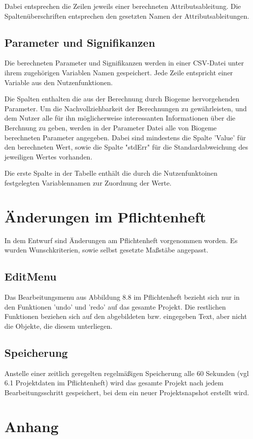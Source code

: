\documentclass{article}
\begin{document}
Dabei entsprechen die Zeilen jeweils einer berechneten Attributsableitung. Die Spaltenüberschriften entsprechen den gesetzten Namen der Attributsableitungen. 

\subsection{Parameter und Signifikanzen}
Die berechneten Parameter und Signifikanzen werden in einer CSV-Datei unter ihrem zugehörigen Variablen Namen gespeichert. Jede Zeile entspricht einer Variable aus den Nutzenfunktionen.

Die Spalten enthalten die aus der Berechnung durch Biogeme hervorgehenden Parameter. Um die Nachvollziehbarkeit der Berechnungen zu gewährleisten, und dem Nutzer alle für ihn  möglicherweise interessanten Informationen über die Berchnung zu geben, werden in der Parameter Datei alle von Biogeme berechneten Parameter angegeben. Dabei sind mindestens die Spalte 'Value' für den berechneten Wert, sowie die Spalte "stdErr" für die Standardabweichung des jeweiligen Wertes vorhanden.

Die erste Spalte in der Tabelle enthält die durch die Nutzenfunktoinen festgelegten Variablennamen zur Zuordnung der Werte.


\section{Änderungen im Pflichtenheft}
In dem Entwurf sind Änderungen am Pflichtenheft vorgenommen worden. Es wurden Wunschkriterien, sowie selbst gesetzte Maßstäbe angepasst.

\subsection{EditMenu}
Das Bearbeitungsmenu aus Abbildung 8.8 im Pflichtenheft bezieht sich nur in den Funktionen 'undo' und 'redo' auf das gesamte Projekt. Die restlichen Funktionen beziehen sich auf den abgebildeten bzw. eingegeben Text, aber nicht die Objekte, die diesem unterliegen.

\subsection{Speicherung}
Anstelle einer zeitlich geregelten regelmäßigen Speicherung alle 60 Sekunden (vgl 6.1 Projektdaten im Pflichtenheft) wird das gesamte Projekt nach jedem Bearbeitungsschritt gespeichert, bei dem ein neuer Projektsnapshot erstellt wird.

\section{Anhang}

\printglossary
\end{document}
